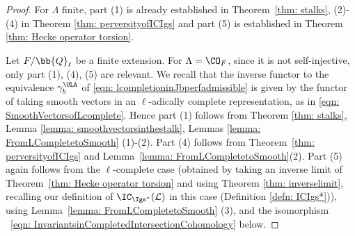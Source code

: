 \documentclass[letterpaper,11pt]{amsart}
\begin{document}
\begin{proof}
For $\Lambda$ finite, part (1) is already established in Theorem~\ref{thm: stalks}, (2)-(4) in Theorem \ref{thm: perversityofICIgs} and part (5) is established in Theorem \ref{thm: Hecke operator torsion}. 

Let $F/\bb{Q}_{\ell}$ be a finite extension. For $\Lambda=\CO_F$, since it is not self-injective, only part (1), (4), (5) are relevant. We recall that the inverse functor to the equivalence $\gamma_{b}^{\ULA}$ of \eqref{eqn: lcompletioninJbperfadmissible} is given by the functor of taking smooth vectors in an $\ell$-adically complete representation, as in \eqref{eqn: SmoothVectorsofLcomplete}. Hence part (1) follows from Theorem \ref{thm: stalks}, Lemma \ref{lemma: smoothvectorsinthestalk}, Lemmas \ref{lemma: FromLCompletetoSmooth} (1)-(2). Part (4) follows from Theorem~\ref{thm: perversityofICIgs} and Lemma~\ref{lemma: FromLCompletetoSmooth}(2). Part (5) again follows from the $\ell$-complete case (obtained by taking an inverse limit of Theorem~\ref{thm: Hecke operator torsion} and using Theorem \ref{thm: inverselimit}, recalling our definition of $\IC_{\Igs^{*}}(\mathcal{L})$ in this case (Definition \ref{defn: ICIgs*})), using Lemma~\ref{lemma: FromLCompletetoSmooth} (3), and the isomorphism ~\eqref{eqn: InvariantsinCompletedIntersectionCohomology} below.


\end{proof}
\end{document}

